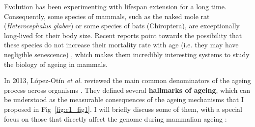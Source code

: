 \bigskip

Evolution has been experimenting with lifespan extension for a long time. Consequently, some species of mammals, such as the naked mole rat (\textit{Heterocephalus glaber}) or some species of bats (Chiroptera), are exceptionally long-lived for their body size. Recent reports point towards the possibility that these species do not increase their mortality rate with age (i.e. they may have negligible senescence) \cite{Ruby2018,Fleischer2017}, which makes them incredibly interesting systems to study the biology of ageing in mammals. 

\bigskip

In 2013, L\'opez-Ot\'in \textit{et al.} reviewed the main common denominators of the ageing process across organisms \cite{Lopez-Otin2013}. They defined several \textbf{hallmarks of ageing}, which can be understood as the measurable consequences of the ageing mechanisms that I proposed in Fig~\ref{fig:c1_fig1}. I will briefly discuss some of them, with a special focus on those that directly affect the genome during mammalian ageing  \cite{Lopez-Otin2013,Singh2019}:

